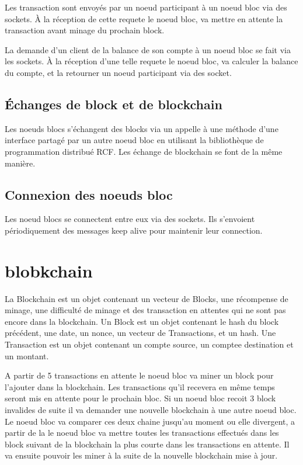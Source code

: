 \documentclass[a4paper,11pt,DIV=12]{scrreprt}
\begin{document}
    Les transaction sont envoyés par un noeud participant à un noeud bloc via
    des sockets. À la réception de cette requete le noeud bloc, va mettre en
    attente la transaction avant minage du prochain block.

    La demande d'un client de la balance de son compte à un noeud bloc se fait
    via les sockets. À la réception d'une telle requete le noeud bloc, va calculer
    la balance du compte, et la retourner un noeud participant via des socket.


    \subsection{Échanges de block et de blockchain}

    Les noeuds blocs s'échangent des blocks via un appelle à une méthode d'une
    interface partagé par un autre noeud bloc en utilisant la bibliothèque de
    programmation distribué RCF.
    Les échange de blockchain se font de la même manière.


    \subsection{Connexion des noeuds bloc}

    Les noeud blocs se connectent entre eux via des sockets. Ils s'envoient
    périodiquement des messages keep alive pour maintenir leur connection. 

    \section{blobkchain}

    La Blockchain est un objet contenant un vecteur de Blocks, une récompense de minage,
    une difficulté de minage et des transaction en attentes qui ne sont pas
    encore dans la blockchain.
    Un Block est un objet contenant le hash du block précédent, une date, un
    nonce, un vecteur de Transactions, et un hash.
    Une Transaction est un objet contenant un compte source, un comptee destination et un montant.

    A partir de 5 transactions en attente le noeud bloc va miner un block pour
    l'ajouter dans la blockchain. Les transactions qu'il recevera en même temps
    seront mis en attente pour le prochain bloc. Si un noeud bloc recoit 3 block
    invalides de suite il va demander une nouvelle blockchain à une autre noeud bloc.
    Le noeud bloc va comparer ces deux chaine jusqu'au moment ou elle divergent,
    a partir de la le noeud bloc va mettre toutes les transactions effectués dans
    les block suivant de la blockchain la plus courte dans les transactions en attente.
    Il va ensuite pouvoir les miner à la suite de la nouvelle blockchain mise à jour.
\end{document}
